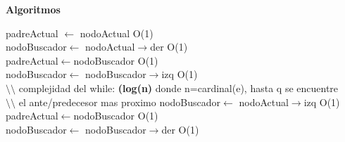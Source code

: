 \documentclass[a4paper,10pt]{article}
\newenvironment{Algoritmos}{%
  \vspace*{2ex}%
  \noindent\textbf{\Large Algoritmos}%
  \vspace*{2ex}%
}{}
\begin{document}
\begin{Algoritmos}
\begin{algorithm}[H]
{    
    {{padreActual $\leftarrow$ nodoActual \hfill O(1) \\}
      {{nodoBuscador$\leftarrow$ nodoActual$\rightarrow$der \hfill O(1) \\}
      {padreActual$\leftarrow$nodoBuscador \hfill O(1) \\ nodoBuscador$\leftarrow$               nodoBuscador$\rightarrow$izq \hfill O(1) \\ }
      $\setminus$$\setminus$ complejidad del while: \textbf{(log(n)} donde n=cardinal(e), hasta q       se encuentre \\ 
      $\setminus$$\setminus$ el ante/predecesor mas proximo
       }
      {
      {{nodoBuscador$\leftarrow$ nodoActual$\rightarrow$izq \hfill O(1) \\}
      {padreActual$\leftarrow$nodoBuscador \hfill O(1) \\ nodoBuscador$\leftarrow$ nodoBuscador$\rightarrow$der \hfill O(1) \\ } 
       }
       {}
      }
      
      }

    
    }

\end{algorithm}


\end{Algoritmos}
\end{document}
